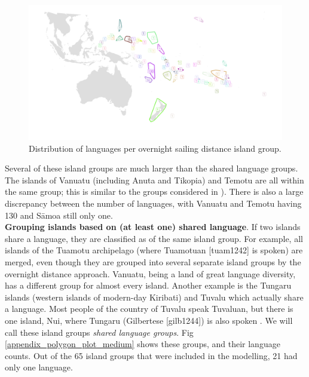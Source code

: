 \documentclass[unnumsec,webpdf,modern,medium]{oup-authoring-template}
\begin{document}
\begin{figure}
\centering
\includegraphics[width=\textwidth]{polygon_SBZR_group_map.png}
\caption{{Distribution of languages per overnight sailing distance island group.}}
\label{appendix_polygon_plot_SBZR}
\end{figure}


Several of these island groups are much larger than the shared language groups. The islands of Vanuatu  (including Anuta and Tikopia) and Temotu are all within the same group; this is similar to the groups considered in \citet{pawley2007}). There is also a large discrepancy between the number of languages, with Vanuatu and Temotu having 130 and S\={a}moa still only one. \\

\textbf{Grouping islands based on (at least one) shared language}. If two islands share a language, they are classified as of the same island group. For example, all islands of the Tuamotu archipelago (where Tuamotuan [tuam1242] is spoken) are merged, even though they are grouped into several separate island groups by the overnight distance approach. Vanuatu, being a land of great language diversity, has a different group for almost every island. Another example is the Tungaru islands (western islands of modern-day Kiribati) and Tuvalu which actually share a language. Most people of the country of Tuvalu speak Tuvaluan, but there is one island, Nui, where Tungaru (Gilbertese [gilb1244]) is also spoken \citep{faaniu1983tuvalu, macdonald_2020, omniglot_tuvaluan}. We will call these island groups \textit{shared language groups}. Fig \ref{appendix_polygon_plot_medium} shows these groups, and their language counts. Out of the 65 island groups that were included in the modelling, 21 had only one language.
\end{document}
